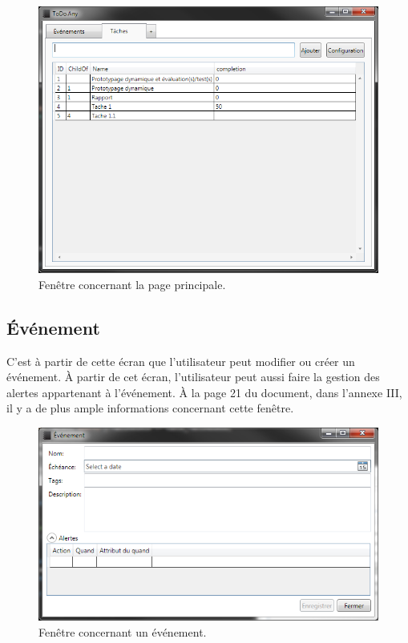 \documentclass[letterpaper, oneside, 12pt, these, creativecommons]{thETS}
\begin{document}
\begin{figure}[H!]
	\centering
	\includegraphics[width=1\textwidth]{fenetre_main.png}
	\caption{Fenêtre concernant la page principale.}
\end{figure}

\newpage

\subsection{Événement}

C'est à partir de cette écran que l'utilisateur peut modifier ou créer un événement. À partir de cet écran, l'utilisateur peut aussi faire la gestion des alertes appartenant à l'événement. À la page 21 du document, dans l'annexe III, il y a de plus ample informations concernant cette fenêtre.

\begin{figure}[H!]
	\centering
	\includegraphics[width=1\textwidth]{fenetre_evenement.png}
	\caption{Fenêtre concernant un événement.}
\end{figure}
\end{document}

